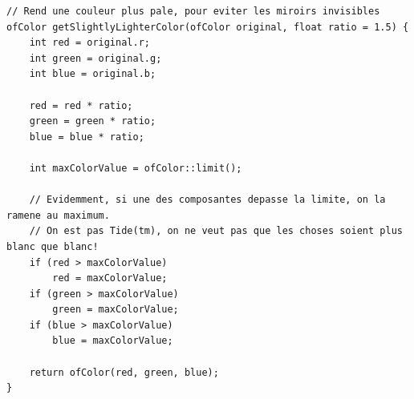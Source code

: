 \begin{lstlisting}
// Rend une couleur plus pale, pour eviter les miroirs invisibles
ofColor getSlightlyLighterColor(ofColor original, float ratio = 1.5) {
	int red = original.r;
	int green = original.g;
	int blue = original.b;
	
	red = red * ratio;
	green = green * ratio;
	blue = blue * ratio;
	
	int maxColorValue = ofColor::limit();
	
	// Evidemment, si une des composantes depasse la limite, on la ramene au maximum.
	// On est pas Tide(tm), on ne veut pas que les choses soient plus blanc que blanc!
	if (red > maxColorValue)
		red = maxColorValue;
	if (green > maxColorValue)
		green = maxColorValue;
	if (blue > maxColorValue)
		blue = maxColorValue;
	
	return ofColor(red, green, blue);
}
\end{lstlisting}

